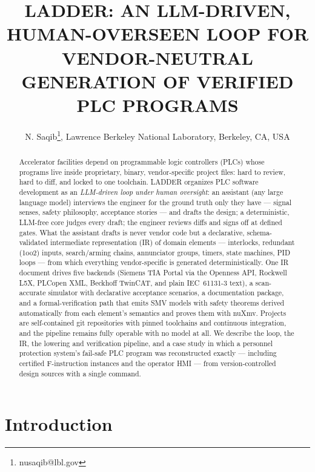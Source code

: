 \documentclass[letterpaper]{jacow}
\begin{document}
\title{LADDER: AN LLM-DRIVEN, HUMAN-OVERSEEN LOOP FOR VENDOR-NEUTRAL GENERATION OF VERIFIED PLC PROGRAMS}

\author{N. Saqib\thanks{nusaqib@lbl.gov}, Lawrence Berkeley National Laboratory, Berkeley, CA, USA}

\maketitle

\begin{abstract}
Accelerator facilities depend on programmable logic controllers (PLCs)
whose programs live inside proprietary, binary, vendor-specific project
files: hard to review, hard to diff, and locked to one toolchain.
LADDER organizes PLC software development as an \emph{LLM-driven loop
under human oversight}: an assistant (any large language model)
interviews the engineer for the ground truth only they have --- signal
senses, safety philosophy, acceptance stories --- and drafts the
design; a deterministic, LLM-free core judges every draft; the
engineer reviews diffs and signs off at defined gates. What the
assistant drafts is never vendor code but a declarative,
schema-validated intermediate representation (IR) of domain elements
--- interlocks, redundant (1oo2) inputs, search/arming chains,
annunciator groups, timers, state machines, PID loops --- from which
everything vendor-specific is generated deterministically. One IR
document drives five backends (Siemens TIA Portal via the Openness API,
Rockwell L5X, PLCopen XML, Beckhoff TwinCAT, and plain IEC~61131-3
text), a scan-accurate simulator with declarative acceptance scenarios,
a documentation package, and a formal-verification path that emits SMV
models with safety theorems derived automatically from each element's
semantics and proves them with nuXmv. Projects are self-contained git
repositories with pinned toolchains and continuous integration, and
the pipeline remains fully operable with no model at all. We describe
the loop, the IR, the lowering and
verification pipeline, and a case study in which a personnel protection
system's fail-safe PLC program was reconstructed exactly --- including
certified F-instruction instances and the operator HMI --- from
version-controlled design sources with a single command.
\end{abstract}

\section{Introduction}
\end{document}
